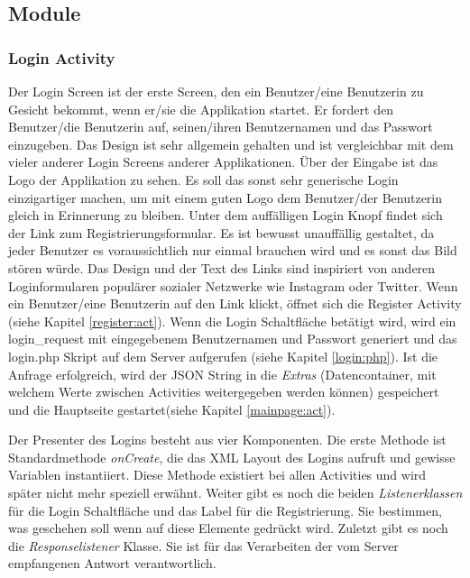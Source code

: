 \documentclass[a4paper,11pt]{report}
\begin{document}
			\subsection{Module}
			
				\subsubsection{Login Activity} \label{login:act}
				Der Login Screen ist der erste Screen, den ein Benutzer/eine Benutzerin zu Gesicht bekommt, wenn er/sie die Applikation startet. Er fordert den Benutzer/die Benutzerin auf, seinen/ihren Benutzernamen und das Passwort einzugeben. Das Design ist sehr allgemein gehalten und ist vergleichbar mit dem vieler anderer Login Screens anderer Applikationen. Über der Eingabe ist das Logo der Applikation zu sehen. Es soll das sonst sehr generische Login einzigartiger machen, um mit einem guten Logo dem Benutzer/der Benutzerin gleich in Erinnerung zu bleiben. Unter dem auffälligen Login Knopf findet sich der Link zum Registrierungsformular. Es ist bewusst unauffällig gestaltet, da jeder Benutzer es voraussichtlich nur einmal brauchen wird und es sonst das Bild stören würde. Das Design und der Text des Links sind inspiriert von anderen Loginformularen populärer sozialer Netzwerke wie Instagram oder Twitter. Wenn ein Benutzer/eine Benutzerin auf den Link klickt, öffnet sich die Register Activity (siehe Kapitel \ref{register:act}). Wenn die Login Schaltfläche betätigt wird, wird ein login\_request mit eingegebenem Benutzernamen und Passwort generiert und das login.php Skript auf dem Server aufgerufen (siehe Kapitel \ref{login:php}). Ist die Anfrage erfolgreich, wird der JSON String in die \emph{Extras} (Datencontainer, mit welchem Werte zwischen Activities weitergegeben werden können) gespeichert und die Hauptseite gestartet(siehe Kapitel \ref{mainpage:act}).
				
				Der Presenter des Logins besteht aus vier Komponenten. Die erste Methode ist Standardmethode \emph{onCreate}, die das XML Layout des Logins aufruft und gewisse Variablen instantiiert. Diese Methode existiert bei allen Activities und wird später nicht mehr speziell erwähnt. Weiter gibt es noch die beiden \emph{Listenerklassen} für die Login Schaltfläche und das Label für die Registrierung. Sie bestimmen, was geschehen soll wenn auf diese Elemente gedrückt wird. Zuletzt gibt es noch die \emph{Responselistener} Klasse. Sie ist für das Verarbeiten der vom Server empfangenen Antwort verantwortlich. 
				
\end{document}
